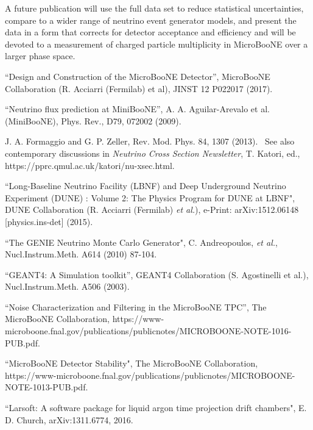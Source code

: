 \documentclass{article}
\begin{document}
A future publication will use the full data set to reduce statistical
uncertainties, compare to a wider range of neutrino event generator models,
and present the data in a form that corrects for detector acceptance and
efficiency and will be devoted to a measurement of charged particle multiplicity in MicroBooNE over a larger phase space.

\begin{thebibliography}{99}
 \textquotedblleft Design and Construction of
the MicroBooNE Detector\textquotedblright, MicroBooNE Collaboration (R. Acciarri (Fermilab) et al), JINST 12 P022017 (2017).

 \textquotedblleft Neutrino flux prediction at
MiniBooNE\textquotedblright , A. A. Aguilar-Arevalo et al. (MiniBooNE),
Phys. Rev., D79, 072002 (2009).

 J. A. Formaggio and G. P. Zeller, Rev. Mod. Phys.
84, 1307 (2013). \ See also contemporary discussions in \textit{Neutrino
Cross Section Newsletter}, T. Katori, ed., https://pprc.qmul.ac.uk/katori/nu-xsec.html.

 ``Long-Baseline Neutrino Facility (LBNF) and Deep
Underground Neutrino Experiment (DUNE) : Volume 2: The Physics Program for
DUNE at LBNF", DUNE Collaboration (R. Acciarri (Fermilab) \textit{et al.}),
e-Print: arXiv:1512.06148 [physics.ins-det] (2015).

 ``The GENIE Neutrino Monte Carlo Generator", C.
Andreopoulos, \textit{et al.}, Nucl.Instrum.Meth. A614 (2010) 87-104.

 \textquotedblleft GEANT4: A Simulation
toolkit\textquotedblright , GEANT4 Collaboration (S. Agostinelli et al.),
Nucl.Instrum.Meth. A506 (2003).

  \textquotedblleft Noise Characterization and Filtering in the
MicroBooNE TPC\textquotedblright,  The MicroBooNE Collaboration,  \newline
https://www-microboone.fnal.gov/publications/publicnotes/MICROBOONE-NOTE-1016-PUB.pdf.

 ``MicroBooNE Detector Stability", The
MicroBooNE Collaboration, \newline
https://www-microboone.fnal.gov/publications/publicnotes/MICROBOONE-NOTE-1013-PUB.pdf.

 ``Larsoft: A software package for liquid argon
time projection drift chambers", E. D. Church, arXiv:1311.6774, 2016.


\end{thebibliography}
\end{document}
